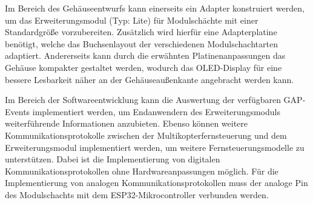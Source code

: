 Im Bereich des Gehäuseentwurfs kann einerseits ein Adapter konstruiert werden, um das Erweiterungsmodul (Typ: Lite) für Modulschächte mit einer Standardgröße vorzubereiten. Zusätzlich wird hierfür eine Adapterplatine benötigt, welche das Buchsenlayout der verschiedenen Modulschachtarten adaptiert. Andererseits kann durch die erwähnten Platinenanpassungen das Gehäuse kompakter gestaltet werden, wodurch das \acs{OLED}-Display für eine bessere Lesbarkeit näher an der Gehäuseaußenkante angebracht werden kann.

Im Bereich der Softwareentwicklung kann die Auswertung der verfügbaren \ac{GAP}-Events implementiert werden, um Endanwendern des Erweiterungsmoduls weiterführende Informationen anzubieten. Ebenso können weitere Kommunikationsprotokolle zwischen der Multikopterfernsteuerung und dem Erweiterungsmodul implementiert werden, um weitere Fernsteuerungsmodelle zu unterstützen. Dabei ist die Implementierung von digitalen Kommunikationsprotokollen ohne Hardwareanpassungen möglich. Für die Implementierung von analogen Kommunikationsprotokollen muss der analoge Pin des Modulschachts mit dem ESP32-Mikrocontroller verbunden werden.